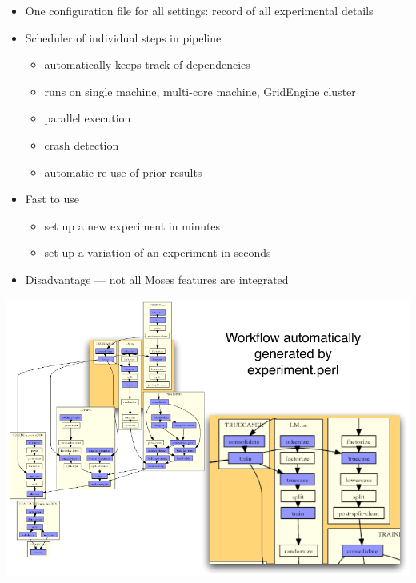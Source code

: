 \documentclass[landscape]{uedslides2C}
\begin{document}
\begin{itemize} \itemsep -1mm
\item One configuration file for all settings: record of all experimental details
\item Scheduler of individual steps in pipeline
\begin{itemize}
\item automatically keeps track of dependencies
\item runs on single machine, multi-core machine, GridEngine cluster
\item parallel execution 
\item crash detection
\item automatic re-use of prior results
\end{itemize}
\item Fast to use
\begin{itemize}
\item set up a new experiment in minutes
\item set up a variation of an experiment in seconds
\end{itemize}

\item Disadvantage --- not all Moses features are integrated

\end{itemize}


\slide{}
\begin{center} \vspace{-5mm}
\includegraphics[scale=1.41]{ems-agenda-composite.pdf}
\end{center}
\end{document}
